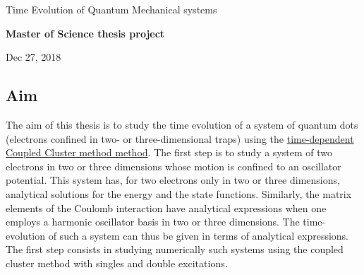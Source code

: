 \documentclass[%
oneside,                 %
final,                   %
10pt]{article}
\begin{document}

\newcommand{\exercisesection}[1]{\subsection*{#1}}






\thispagestyle{empty}

\begin{center}
{\LARGE\bf
\begin{spacing}{1.25}
Time Evolution of Quantum Mechanical systems
\end{spacing}
}
\end{center}


\begin{center}
{\bf Master of Science thesis project${}^{}$} \\ [0mm]
\end{center}

\begin{center}
\end{center}
    

\begin{center}
Dec 27, 2018
\end{center}

\vspace{1cm}


\subsection{Aim}

The aim of this thesis is to study the time evolution of a system of
quantum dots (electrons confined in two- or three-dimensional traps) using the
\href{{https://github.com/haakoek/PythonVersionMaster/tree/master/Thesis/Chapters}}{time-dependent Coupled Cluster method
method}. The
first step is to study a system of two electrons in two or three
dimensions whose motion is confined to an oscillator potential. This
system has, for two electrons only in two or three dimensions,
analytical solutions for the energy and the state
functions. Similarly, the matrix elements of the Coulomb interaction
have analytical expressions when one employs a harmonic oscillator
basis in two or three dimensions. The time-evolution of such a system
can thus be given in terms of analytical expressions. The first step
consists in studying numerically such systems using the coupled
cluster method with singles and double excitations.  
\end{document}

